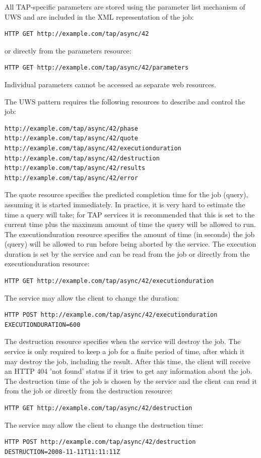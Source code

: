 \documentclass[11pt,letter]{ivoa}
\begin{document}
All TAP-specific parameters are stored using the parameter list mechanism of 
UWS and are included in the XML representation of the job:
\begin{verbatim}
HTTP GET http://example.com/tap/async/42
\end{verbatim}
or directly from the parameters resource:
\begin{verbatim}
HTTP GET http://example.com/tap/async/42/parameters
\end{verbatim}
Individual parameters cannot be accessed as separate web resources.

The UWS pattern requires the following resources to describe and control the 
job:
\begin{verbatim}
http://example.com/tap/async/42/phase
http://example.com/tap/async/42/quote
http://example.com/tap/async/42/executionduration
http://example.com/tap/async/42/destruction
http://example.com/tap/async/42/results
http://example.com/tap/async/42/error
\end{verbatim}
The quote resource specifies the predicted completion time for the job (query), 
assuming it is started immediately. In practice, it is very hard to estimate the 
time a query will take; for TAP services it is recommended that this is set to 
the current time plus the maximum amount of time the query will be allowed to 
run. The executionduration resource specifies the amount of time (in seconds) 
the job (query) will be allowed to run before being aborted by the service. The 
execution duration is set by the service and can be read from the job or 
directly from the executionduration resource:

\begin{verbatim}
HTTP GET http://example.com/tap/async/42/executionduration
\end{verbatim}
The service may allow the client to change the duration:
\begin{verbatim}
HTTP POST http://example.com/tap/async/42/executionduration
EXECUTIONDURATION=600
\end{verbatim}

The destruction resource specifies when the service will destroy the job. The 
service is only required to keep a job for a finite period of time, after which 
it may destroy the job, including the result. After this time, the client will 
receive an HTTP 404 'not found' status if it tries to get any information about 
the job. The destruction time of the job is chosen by the service and the client 
can read it from the job or directly from the destruction resource:
\begin{verbatim}
HTTP GET http://example.com/tap/async/42/destruction
\end{verbatim}
The service may allow the client to change the destruction time:
\begin{verbatim}
HTTP POST http://example.com/tap/async/42/destruction
DESTRUCTION=2008-11-11T11:11:11Z
\end{verbatim}
\end{document}
